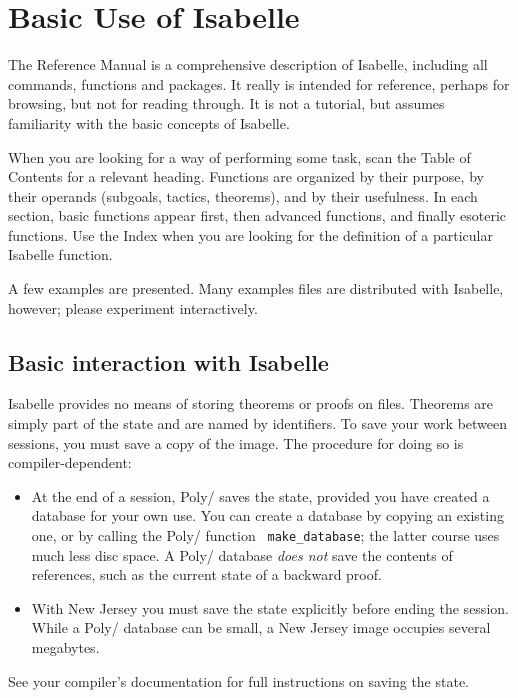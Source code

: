 \chapter{Basic Use of Isabelle} 
The Reference Manual is a comprehensive description of Isabelle, including
all commands, functions and packages.  It really is intended for reference,
perhaps for browsing, but not for reading through.  It is not a tutorial,
but assumes familiarity with the basic concepts of Isabelle.

When you are looking for a way of performing some task, scan the Table of
Contents for a relevant heading.  Functions are organized by their purpose,
by their operands (subgoals, tactics, theorems), and by their usefulness.
In each section, basic functions appear first, then advanced functions, and
finally esoteric functions.  Use the Index when you are looking for the
definition of a particular Isabelle function.

A few examples are presented.  Many examples files are distributed with
Isabelle, however; please experiment interactively.


\section{Basic interaction with Isabelle}
Isabelle provides no means of storing theorems or proofs on files.
Theorems are simply part of the \ML{} state and are named by \ML{}
identifiers.  To save your work between sessions, you must save a copy of
the \ML{} image.  The procedure for doing so is compiler-dependent:
\begin{itemize}
\item At the end of a session, Poly/\ML{} saves the state, provided you
  have created a database for your own use.  You can create a database by
  copying an existing one, or by calling the Poly/\ML{} function {\tt
    make_database}; the latter course uses much less disc space.  A
  Poly/\ML{} database {\em does not\/} save the contents of references,
  such as the current state of a backward proof.

\item With New Jersey \ML{} you must save the state explicitly before
ending the session.  While a Poly/\ML{} database can be small, a New Jersey
image occupies several megabytes.
\end{itemize}
See your \ML{} compiler's documentation for full instructions on saving the
state.

